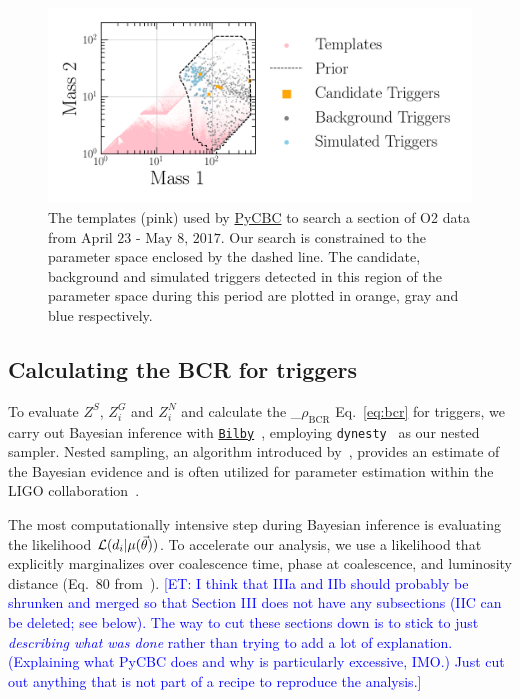 \documentclass[%
 nofootinbib,
 amsmath,amssymb,
 aps,
 twocolumn,
 superscriptaddress
]{revtex4-2}
\newcommand{\bilby}{{\sc \href{https://lscsoft.docs.ligo.org/bilby/}{\texttt{Bilby}}}\xspace}
\newcommand{\dynesty}{{\sc \texttt{dynesty}}\xspace}
\newcommand{\pycbc}{{\sc \href{https://pycbc.org/}{{PyCBC}}}\xspace}
\newcommand{\mathcmd}[1]{{\sc \relax\ifmmode#1\else $#1$\fi}\xspace}
\newcommand{\bcr}{\mathcmd{\rho_\text{BCR}}}
\newcommand{\parameters}{\mathcmd{\vec{\theta}}}
\newcommand{\template}{\mathcmd{\mu(\parameters)}}
\newcommand{\et}[1]{\textcolor{blue}{[ET: #1]}}
\begin{document}
\begin{figure}[!ht]

{\centering \includegraphics[width=0.75\linewidth]{images/template_bank.png}

}
\caption[ BCR search space.]{The templates (pink) used by \pycbc to search a section of O2 data from $\text{April 23 - May 8, 2017}$. Our search is constrained to the parameter space enclosed by the dashed line. The candidate, background and simulated triggers detected in this region of the parameter space during this period are plotted in orange, gray and blue respectively.}\label{fig:templateBank}
\end{figure}


\subsection{Calculating the BCR for triggers}
To evaluate $Z^S$, $Z^G_i$ and $Z^N_i$ and calculate the \bcr Eq.~\ref{eq:bcr} for triggers, we carry out Bayesian inference with \bilby~\cite{bilby, bilby_pipe}, employing \dynesty~\cite{dynesty} as our nested sampler. Nested sampling, an algorithm introduced by~\citet{skilling2004, skilling2006}, provides an estimate of the Bayesian evidence and is often utilized for parameter estimation within the LIGO collaboration~\cite{bilby, bilby_paper, pbilby_paper}.

The most computationally intensive step during Bayesian inference is evaluating the likelihood $\mathcal{L}(d_i|\template)$. To accelerate our analysis, we use a likelihood that explicitly marginalizes over coalescence time, phase at coalescence, and luminosity distance (Eq.~80 from~\citet{intro_to_gw_bayes}).
\et{I think that IIIa and IIb should probably be shrunken and merged so that Section III does not have any subsections (IIC can be deleted; see below). The way to cut these sections down is to stick to just \textit{describing what was done} rather than trying to add a lot of explanation. (Explaining what PyCBC does and why is particularly excessive, IMO.) Just cut out anything that is not part of a recipe to reproduce the analysis.}
\end{document}
